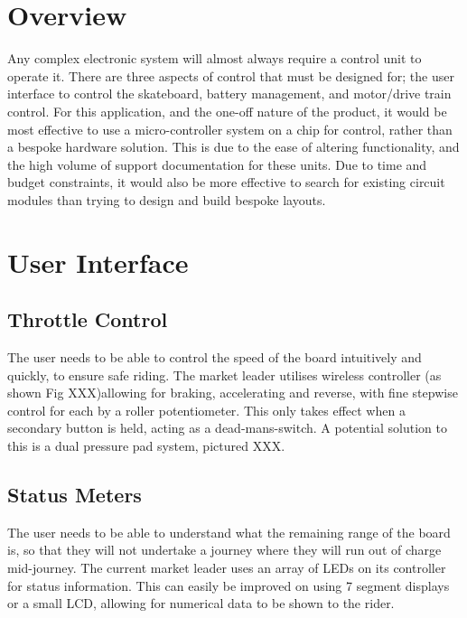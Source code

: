 \documentclass[journal,10pt]{IEEEtran}
\begin{document}
\section{Overview}
	Any complex electronic system will almost always require a control unit to operate it.
	There are three aspects of control that must be designed for; the user interface to control the skateboard, battery management, and motor/drive train control.
	For this application, and the one-off nature of the product, it would be most effective to use a micro-controller system on a chip for control, rather than a bespoke hardware solution.
	This is due to the ease of altering functionality, and the high volume of support documentation for these units.
	Due to time and budget constraints, it would also be more effective to search for existing circuit modules than trying to design and build bespoke layouts.
\section{User Interface}
	\subsection{Throttle Control}
		The user needs to be able to control the speed of the board intuitively and quickly, to ensure safe riding.
		The market leader utilises wireless controller (as shown Fig XXX)allowing for braking, accelerating and reverse, with fine stepwise control for each by a roller potentiometer.
		This only takes effect when a secondary button is held, acting as a dead-mans-switch.
		A potential solution to this is a dual pressure pad system, pictured XXX.
	\subsection{Status Meters}
		The user needs to be able to understand what the remaining range of the board is, so that they will not undertake a journey where they will run out of charge mid-journey.
	The current market leader uses an array of LEDs on its controller for status information.
		This can easily be improved on using 7 segment displays or a small LCD, allowing for numerical data to be shown to the rider.
\end{document}
